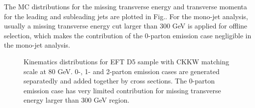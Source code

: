 The MC distributions for the missing transverse energy and transverse momenta for the leading and subleading jets are plotted in Fig.. For the mono-jet analysis, usually a missing transverse energy cut larger than 300 GeV is applied for offline selection, which makes the contribution of the 0-parton emission case negligible in the mono-jet analysis.

\begin{figure}[h!]
	\centering  
	\hfill
	\hfill
	\caption{Kinematics distributions for EFT D5 sample with CKKW matching scale at 80 GeV. 0-, 1- and 2-parton emission cases are generated separatedly and added together by cross sections. The 0-parton emission case has very limited contribution for missing transverse energy larger than 300 GeV region.}
	\label{fig:Kine_D5_80}
\end{figure}


